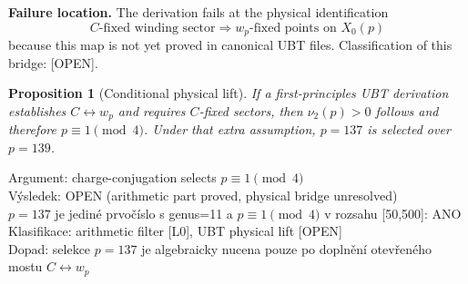 \documentclass[12pt,a4paper]{article}
\newtheorem{proposition}[lemma]{Proposition}
\begin{document}
\textbf{Failure location.}
The derivation fails at the physical identification
\begin{equation}
C\text{-fixed winding sector} \Rightarrow w_p\text{-fixed points on }X_0(p)
\end{equation}
because this map is not yet proved in canonical UBT files.
Classification of this bridge: [OPEN].

\begin{proposition}[Conditional physical lift]
If a first-principles UBT derivation establishes
$C\leftrightarrow w_p$ and requires $C$-fixed sectors,
then $\nu_2(p)>0$ follows and therefore $p\equiv 1\pmod 4$.
Under that extra assumption, $p=137$ is selected over $p=139$.
\end{proposition}

\begin{statusbox}
Argument: charge-conjugation selects $p \equiv 1 \pmod 4$\\
Výsledek: OPEN (arithmetic part proved, physical bridge unresolved)\\
$p=137$ je jediné prvočíslo s genus=11 a $p\equiv1\pmod4$ v rozsahu [50,500]: ANO\\
Klasifikace: arithmetic filter [L0], UBT physical lift [OPEN]\\
Dopad: selekce $p=137$ je algebraicky nucena pouze po doplnění otevřeného mostu $C\leftrightarrow w_p$
\end{statusbox}

\ifdefined\INCLUDEMODE
\else
  
\end{document}
